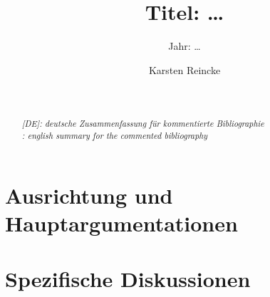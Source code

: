 \documentclass[
  DIV=calc,
  BCOR=5mm,
  11pt,
  smallheadings,
  oneside,
  abstract=true,
  toc=bib,
  english,ngerman]{scrartcl}
\begin{document}

\titlehead{Exzerpt (Deutsche Konfiguration)}
\subject{Autor(en): \ldots}
\title{Titel: \ldots}
\subtitle{Jahr: \ldots }
\author{Karsten Reincke}

\maketitle

\begin{abstract}
\noindent
\cite[(in:)][]{Brachman1985a} \\
\noindent
\cite[(ist:)][219 - 221]{Hays1985a} \\
\noindent \itshape
[DE]: deutsche Zusammenfassung für kommentierte Bibliographie \\
\noindent
[EN]: english summary for the commented bibliography
\end{abstract}
\footnotesize
\normalsize

\section{Ausrichtung und Hauptargumentationen}

\section{Spezifische Diskussionen}

\small

\end{document}

